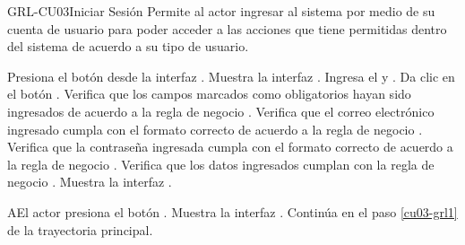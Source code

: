 \begin{UseCase}[]{GRL-CU03}{Iniciar Sesión}{
	Permite al actor ingresar al sistema por medio de su cuenta de usuario para poder acceder a las
acciones que tiene permitidas dentro del sistema de acuerdo a su tipo de usuario.
}
\end{UseCase}

\begin{UCtrayectoria}
	\UCpaso [\UCactor] Presiona el botón  desde la interfaz .
    \UCpaso [\UCsist] Muestra la interfaz .
	\UCpaso [\UCactor] Ingresa el  y .\label{cu03-grl1}
	\UCpaso [\UCactor] Da clic en el botón .   
	\UCpaso [\UCsist] Verifica que los campos marcados como obligatorios hayan sido ingresados de acuerdo a la
	regla de negocio .
	\UCpaso [\UCsist] Verifica que el correo electrónico ingresado cumpla con el formato correcto de acuerdo a la regla de negocio  .  
	\UCpaso [\UCsist] Verifica que la contraseña ingresada cumpla con el formato correcto de acuerdo a la regla de negocio  .
	\UCpaso [\UCsist] Verifica que los datos ingresados cumplan con la regla de negocio . 
    \UCpaso [\UCsist] Muestra la interfaz . %
\end{UCtrayectoria}

\begin{UCtrayectoriaA}{A}{El actor presiona el botón .}
	\UCpaso [\UCsist] Muestra la interfaz .
	\UCpaso [\UCsist] Continúa en el paso \ref{cu03-grl1} de la trayectoria principal.
\end{UCtrayectoriaA}

